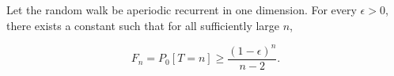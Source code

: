 Let the random walk be aperiodic recurrent in one dimension. For every $\epsilon > 0$, there exists a constant such that for all sufficiently large $n$,

$$F_n = P_0[T = n] \geq \frac{(1 - \epsilon)^n}{n - 2}.$$
